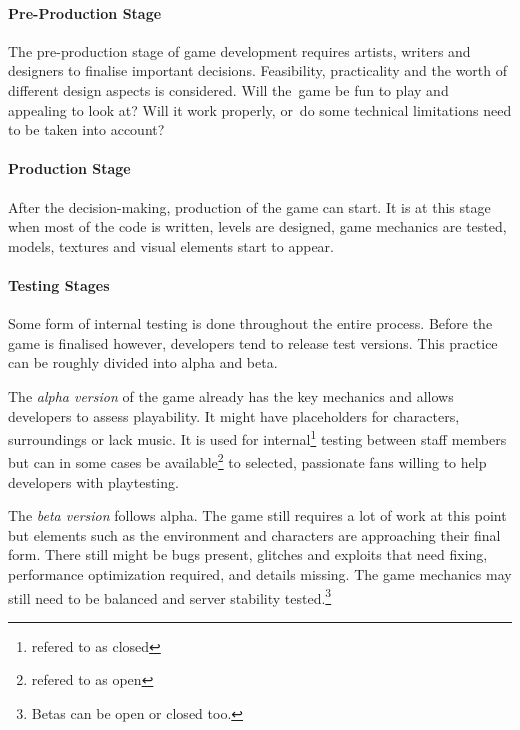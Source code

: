 \paragraph{Pre-Production Stage}
The pre-production stage of game development requires artists, writers and designers to finalise important decisions. Feasibility, practicality and the worth of different design aspects is considered. Will the~game be fun to play and appealing to look at? Will it work properly, or~do some technical limitations need to be taken into account?
\cite{bramble_7-stages, rocket_6-stages}

\paragraph{Production Stage}
After the decision-making, production of the game can start. It is at this stage when most of the code is written, levels are designed, game mechanics are tested, models, textures and visual elements start to appear.
\cite{bramble_7-stages, rocket_6-stages}

\paragraph{Testing Stages}
Some form of internal testing is done throughout the entire process. Before the game is finalised however, developers tend to release test versions. This practice can be roughly divided into alpha and beta.

The \textit{alpha version} of the game already has the key mechanics and allows developers to assess playability. It might have placeholders for characters, surroundings or lack music. It is used for internal\footnote{refered to as closed} testing between staff members but can in some cases be available\footnote{refered to as open} to selected, passionate fans willing to help developers with playtesting.

The \textit{beta version} follows alpha. The game still requires a lot of work at this point but elements such as the environment and characters are approaching their final form. There still might be bugs present, glitches and exploits that need fixing, performance optimization required, and details missing. The game mechanics may still need to be balanced and server stability tested.\footnote{Betas can be open or closed too.}
\cite{bramble_7-stages, rocket_6-stages, esler_viable-games}


